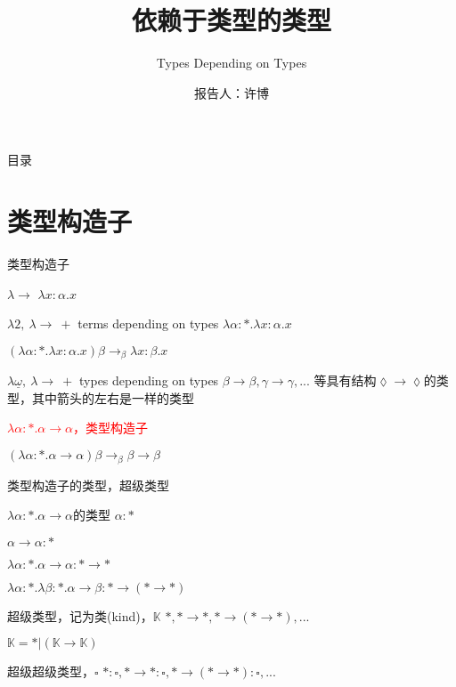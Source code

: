 \documentclass[UTF8,aspectratio=169,mathserif]{beamer}
\title{依赖于类型的类型}
\subtitle{Types Depending on Types}
\author{报告人：许博}
\date{}
\begin{document}
	
	\begin{frame}
		\titlepage
	\end{frame}

	\begin{frame}{目录}
		\tableofcontents
	\end{frame}

	\section{类型构造子}
	\begin{frame}{类型构造子}
		\begin{block}{$\lambda{\rightarrow}$}
			$\lambda x:\alpha.x$
		\end{block}
		
		\begin{block}{$\lambda{2},\ \lambda{\rightarrow}\ + $ terms depending on types}
			$\lambda\alpha:*.\lambda x:\alpha.x$
			
			$(\lambda\alpha:*.\lambda x:\alpha.x)\beta\rightarrow_\beta\lambda x:\beta.x$
		\end{block}
	
		\begin{block}{$\lambda{\underline{\omega}},\ \lambda{\rightarrow}\ + $ types depending on types}
			$\beta\rightarrow\beta,\gamma\rightarrow\gamma,...$ 等具有结构$\lozenge\rightarrow\lozenge$的类型，其中箭头的左右是一样的类型
			
			\textcolor{red}{$\lambda\alpha:*.\alpha\rightarrow\alpha$，类型构造子}
			
			$(\lambda\alpha:*.\alpha\rightarrow\alpha)\beta\rightarrow_\beta\beta\rightarrow\beta$
		\end{block}
	\end{frame}

	\begin{frame}{类型构造子的类型，超级类型}
		\begin{block}{$\lambda\alpha:*.\alpha\rightarrow\alpha$的类型}
			$\alpha:*$
			
			$\alpha\rightarrow\alpha:*$
			
			$\lambda\alpha:*.\alpha\rightarrow\alpha:*\rightarrow*$
			
			$\lambda\alpha:*.\lambda\beta:*.\alpha\rightarrow\beta:*\rightarrow(*\rightarrow*)$
		\end{block}
		\begin{block}{超级类型，记为类(kind)，$\mathbb{K}$}
			$*, *\rightarrow*, *\rightarrow(*\rightarrow*), ...$
			
			$\mathbb{K}=*|(\mathbb{K}\rightarrow\mathbb{K})$
		\end{block}
		\begin{block}{超级超级类型，$\square$}
			$*:\square, *\rightarrow*:\square, *\rightarrow(*\rightarrow*):\square, ...$
		\end{block}
	\end{frame}
\end{document}
